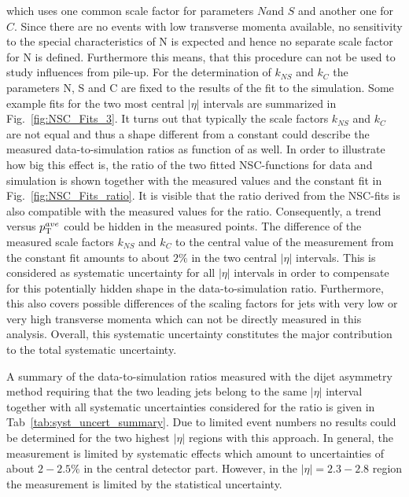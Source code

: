 \begin{description}
which uses one common scale factor for parameters $N a$nd $S$ and another one for $C$. Since there are no events with low transverse momenta available, no sensitivity to the special characteristics of N is expected and hence no separate scale factor for N is defined. Furthermore this means, that this procedure can not be used to study influences from pile-up. For the determination of $k_{NS}$ and $k_{C}$ the parameters N, S and C are fixed to the results of the fit to the simulation. Some example fits for the two most central $|\eta|$ intervals are summarized in Fig.~\ref{fig:NSC_Fits_3}. It turns out that typically the scale factors $k_{NS}$ and $k_{C}$ are not equal and thus a shape different from a constant could describe the measured data-to-simulation ratios as function of \ptave as well. In order to illustrate how big this effect is, the ratio of the two fitted NSC-functions for data and simulation is shown together with the measured values and the constant fit in Fig.~\ref{fig:NSC_Fits_ratio}. It is visible that the ratio derived from the NSC-fits is also compatible with the measured values for the ratio. Consequently, a trend versus $p_{\text{T}}^{ave}$ could be hidden in the measured points. The difference of the measured scale factors $k_{NS}$ and $k_{C}$ to the central value of the measurement from the constant fit amounts to about $2\%$ in the two central $|\eta|$ intervals. This is considered as systematic uncertainty for all $|\eta|$ intervals in order to compensate for this potentially hidden shape in the data-to-simulation ratio. Furthermore, this also covers possible differences of the scaling factors for jets with very low or very high transverse momenta which can not be directly measured in this analysis. Overall, this systematic uncertainty constitutes the major contribution to the total systematic uncertainty.

\end{description}

A summary of the data-to-simulation ratios measured with the dijet asymmetry method requiring that the two leading jets belong to the same $|\eta|$ interval together with all systematic uncertainties considered for the ratio is given in Tab~\ref{tab:syst_uncert_summary}. Due to limited event numbers no results could be determined for the two highest $|\eta|$ regions with this approach. In general, the measurement is limited by systematic effects which amount to uncertainties of about $2-2.5\%$ in the central detector part. However, in the $|\eta| = 2.3-2.8$ region the measurement is limited by the statistical uncertainty.   


